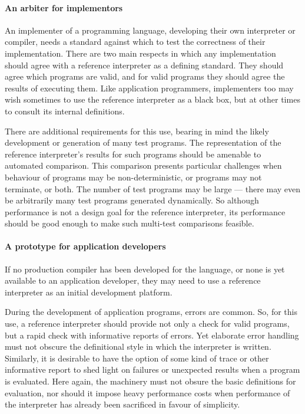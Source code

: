 \paragraph{An arbiter for implementors}
An implementer of a programming language,
developing their own interpreter or compiler,
needs a standard against which to test the correctness
of their implementation.
There are two main respects in which any
implementation should agree with a reference interpreter
as a defining standard.
They should agree which programs are valid,
and for valid programs they should agree the results
of executing them.
Like application programmers, implementers too may
wish sometimes to use the reference interpreter as
a black box, but at other times to consult its
internal definitions. 

There are additional requirements for this use,
bearing in mind the likely development or generation
of many test programs.
The representation of the
reference interpreter's results for such programs
should be amenable to automated comparison.
This comparison presents particular challenges when
behaviour of programs may be non-deterministic,
or programs may not terminate, or both.
The number of test programs may be large
--- there may even be arbitrarily many test programs generated dynamically.
So although performance is not a design goal for the reference
interpreter, its performance should be good enough to
make such multi-test comparisons feasible.

\paragraph{A prototype for application developers}
If no production compiler has been developed for the language,
or none is yet available to an application developer,
they may need to use a reference interpreter as
an initial development platform.

During the development of application programs, errors
are common.
So, for this use, a reference interpreter should provide
not only a check for valid programs, but a rapid check
with informative reports of errors.
Yet elaborate error handling must not obscure the
definitional style in which the interpreter is written.
Similarly, it is desirable to have the option of some
kind of trace or other informative report to shed
light on failures or unexpected results when a program
is evaluated.
Here again, the machinery must not obsure the basic
definitions for evaluation, nor should it impose heavy
performance costs when performance of the interpreter
has already been sacrificed in favour of simplicity.

